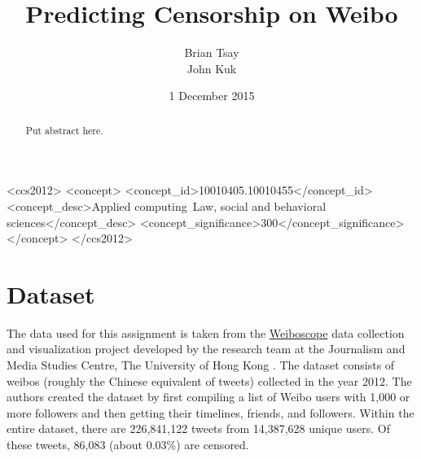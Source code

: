 \documentclass{sig-alternate-05-2015}
\begin{document}
\title{Predicting Censorship on Weibo}

\author{
  \alignauthor
  Brian Tsay \\
  \alignauthor
  John Kuk \\
}

\date{1 December 2015}

\maketitle

\begin{abstract}
  Put abstract here.
\end{abstract}


 \begin{CCSXML}
<ccs2012>
<concept>
<concept_id>10010405.10010455</concept_id>
<concept_desc>Applied computing~Law, social and behavioral sciences</concept_desc>
<concept_significance>300</concept_significance>
</concept>
</ccs2012>
\end{CCSXML}

\printccsdesc

\section{Dataset} \label{sec:data}
The data used for this assignment is taken from the \href{http://weiboscope.jmsc.hku.hk/datazip/}{Weiboscope} data collection and visualization project developed by the research team at the Journalism and Media Studies Centre, The University of Hong Kong \cite{Fu2013a}. The dataset consists of weibos (roughly the Chinese equivalent of tweets) collected in the year 2012. The authors created the dataset by first compiling a list of Weibo users with 1,000 or more followers and then getting their timelines, friends, and followers. Within the entire dataset, there are 226,841,122 tweets from 14,387,628 unique users. Of these tweets, 86,083 (about 0.03\%) are censored.
\end{document}
